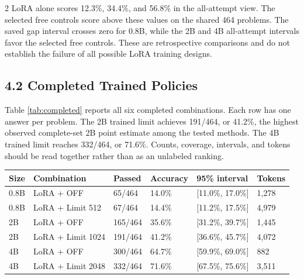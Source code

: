 \documentclass[11pt,letterpaper]{article}
\begin{document}
\begin{multicols}{2}
LoRA alone scores 12.3\%, 34.4\%, and 56.8\% in the all-attempt view. The selected free controls score above these values on the shared 464 problems. The saved gap interval crosses zero for 0.8B, while the 2B and 4B all-attempt intervals favor the selected free controls. These are retrospective comparisons and do not establish the failure of all possible LoRA training designs.\par

\subsection*{4.2 Completed Trained Policies}

Table \ref{tab:completed} reports all six completed combinations. Each row has one answer per problem. The 2B trained limit achieves 191/464, or 41.2\%, the highest observed complete-set 2B point estimate among the tested methods. The 4B trained limit reaches 332/464, or 71.6\%. Counts, coverage, intervals, and tokens should be read together rather than as an unlabeled ranking.\par

\end{multicols}
\begin{center}\begin{minipage}{\textwidth}
\begingroup\singlespacing\small\setlength{\tabcolsep}{4pt}
\label{tab:completed}
\begin{tabular}{|p{0.913in}|p{0.913in}|p{0.913in}|p{0.913in}|p{0.913in}|p{0.913in}|}
\hline
\textbf{Size} & \textbf{Combination} & \textbf{Passed} & \textbf{Accuracy} & \textbf{95\% interval} & \textbf{Tokens}\\\hline
0.8B & LoRA + OFF & 65/464 & 14.0\% & [11.0\%, 17.0\%] & 1,278\\\hline
0.8B & LoRA + Limit  512 & 67/464 & 14.4\% & [11.2\%, 17.5\%] & 4,979\\\hline
2B & LoRA + OFF & 165/464 & 35.6\% & [31.2\%, 39.7\%] & 1,445\\\hline
2B & LoRA + Limit  1024 & 191/464 & 41.2\% & [36.6\%, 45.7\%] & 4,072\\\hline
4B & LoRA + OFF & 300/464 & 64.7\% & [59.9\%, 69.0\%] & 882\\\hline
4B & LoRA + Limit  2048 & 332/464 & 71.6\% & [67.5\%, 75.6\%] & 3,511\\\hline
\end{tabular}
\endgroup
\end{minipage}\end{center}
\end{document}
